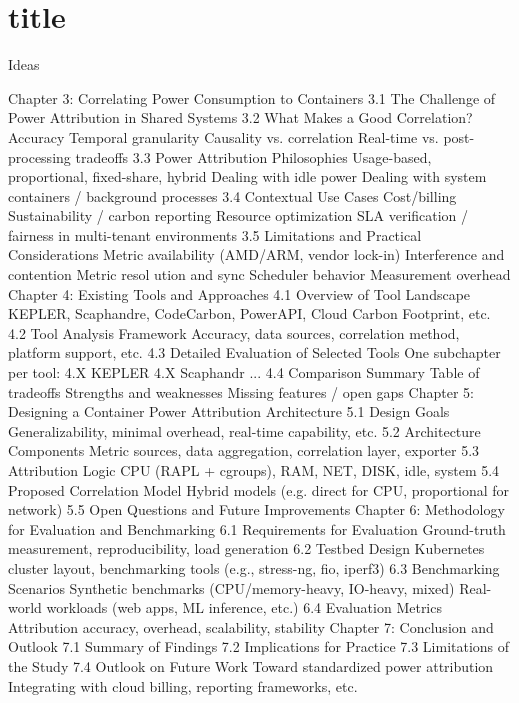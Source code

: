 \chapter{title} %

Ideas

Chapter 3: Correlating Power Consumption to Containers
    3.1 The Challenge of Power Attribution in Shared Systems
    3.2 What Makes a Good Correlation?
        Accuracy
        Temporal granularity
        Causality vs. correlation
        Real-time vs. post-processing tradeoffs
    3.3 Power Attribution Philosophies
        Usage-based, proportional, fixed-share, hybrid
        Dealing with idle power
        Dealing with system containers / background processes
    3.4 Contextual Use Cases
        Cost/billing
        Sustainability / carbon reporting
        Resource optimization
        SLA verification / fairness in multi-tenant environments
    3.5 Limitations and Practical Considerations
        Metric availability (AMD/ARM, vendor lock-in)
        Interference and contention
        Metric resol ution and sync
        Scheduler behavior
        Measurement overhead
Chapter 4: Existing Tools and Approaches
    4.1 Overview of Tool Landscape
        KEPLER, Scaphandre, CodeCarbon, PowerAPI, Cloud Carbon Footprint, etc.
    4.2 Tool Analysis Framework
        Accuracy, data sources, correlation method, platform support, etc.
    4.3 Detailed Evaluation of Selected Tools
        One subchapter per tool:
            4.X KEPLER
            4.X Scaphandr
            ...
    4.4 Comparison Summary
        Table of tradeoffs
        Strengths and weaknesses
        Missing features / open gaps
Chapter 5: Designing a Container Power Attribution Architecture
    5.1 Design Goals
        Generalizability, minimal overhead, real-time capability, etc.
    5.2 Architecture Components
        Metric sources, data aggregation, correlation layer, exporter
    5.3 Attribution Logic
        CPU (RAPL + cgroups), RAM, NET, DISK, idle, system
    5.4 Proposed Correlation Model
        Hybrid models (e.g. direct for CPU, proportional for network)
    5.5 Open Questions and Future Improvements
Chapter 6: Methodology for Evaluation and Benchmarking
    6.1 Requirements for Evaluation
        Ground-truth measurement, reproducibility, load generation
    6.2 Testbed Design
        Kubernetes cluster layout, benchmarking tools (e.g., stress-ng, fio, iperf3)
    6.3 Benchmarking Scenarios
        Synthetic benchmarks (CPU/memory-heavy, IO-heavy, mixed)
        Real-world workloads (web apps, ML inference, etc.)
    6.4 Evaluation Metrics
        Attribution accuracy, overhead, scalability, stability
Chapter 7: Conclusion and Outlook
    7.1 Summary of Findings
    7.2 Implications for Practice
    7.3 Limitations of the Study
    7.4 Outlook on Future Work
        Toward standardized power attribution
        Integrating with cloud billing, reporting frameworks, etc.